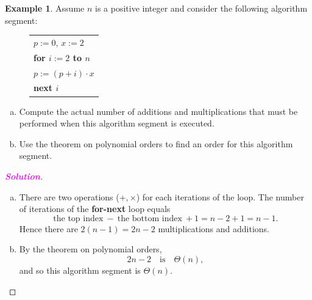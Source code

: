 \documentclass[12pt,openany]{book}
\theoremstyle{definition}
\newtheorem{example}{Example}[chapter]
\newcommand{\sol}{\textcolor{magenta}{\bf Solution}}
\newcommand{\tab}{\hspace{8pt}}
\begin{document}
	\begin{example}
		Assume $n$ is a positive integer and consider the following algorithm segment:
		\begin{figure}[h!]
			\centering
			\begin{tabular}{l}
				$p:=0$, $x:=2$\\
				\textbf{for $i:=2$ to $n$}\\
				\tab$p:=(p+i)\cdot x$\\
				\textbf{next $i$}
			\end{tabular}
		\end{figure}
		\begin{enumerate}[a.]
			\item Compute the actual number of additions and multiplications that must be performed when this algorithm segment is executed.
			\item Use the theorem on polynomial orders to find an order for this algorithm segment.
		\end{enumerate}
		\begin{proof}[\sol]
			\ \begin{enumerate}[a.]
				\item There are two operations ($+,\times$) for each iterations of the loop. The number of iterations of the \textbf{for-next} loop equals \[
				\text{the top index}\ -\ \text{the bottom index}\ + 1=n-2+1=n-1.
				\] Hence there are $2(n-1)=2n-2$ multiplications and additions.
				\item By the theorem on polynomial orders, \[
				2n-2\quad\text{is}\quad\Theta(n),
				\] and so this algorithm segment is  $\Theta(n)$.
			\end{enumerate}
		\end{proof}
	\end{example}
	
\end{document}
